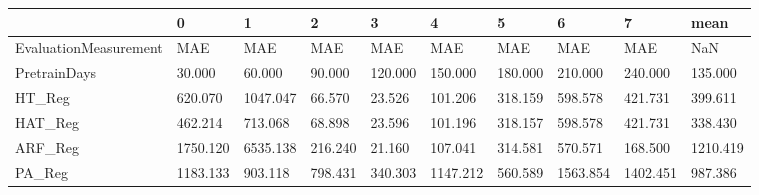 \begin{tabular}{llllllllll}
\toprule
{} &        0 &        1 &       2 &       3 &        4 &       5 &        6 &        7 &     mean \\
\midrule
EvaluationMeasurement &      MAE &      MAE &     MAE &     MAE &      MAE &     MAE &      MAE &      MAE &      NaN \\
PretrainDays          &   30.000 &   60.000 &  90.000 & 120.000 &  150.000 & 180.000 &  210.000 &  240.000 &  135.000 \\
HT\_Reg                &  620.070 & 1047.047 &  66.570 &  23.526 &  101.206 & 318.159 &  598.578 &  421.731 &  399.611 \\
HAT\_Reg               &  462.214 &  713.068 &  68.898 &  23.596 &  101.196 & 318.157 &  598.578 &  421.731 &  338.430 \\
ARF\_Reg               & 1750.120 & 6535.138 & 216.240 &  21.160 &  107.041 & 314.581 &  570.571 &  168.500 & 1210.419 \\
PA\_Reg                & 1183.133 &  903.118 & 798.431 & 340.303 & 1147.212 & 560.589 & 1563.854 & 1402.451 &  987.386 \\
\bottomrule
\end{tabular}
